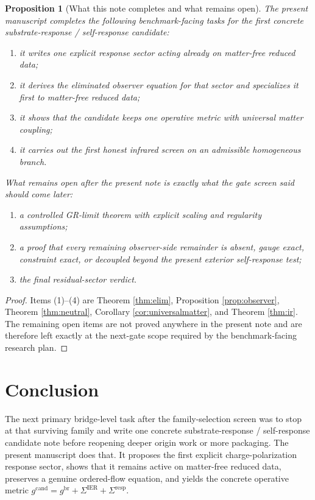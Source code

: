 \documentclass[11pt]{article}
\newcommand{\ObserverMetric}{g^{\mathrm{br}}}
\newcommand{\CandidateMetric}{g^{\mathrm{cand}}}
\newcommand{\BaseShift}{\Sigma^{\mathrm{IER}}}
\newcommand{\ResponseShift}{\Sigma^{\mathrm{resp}}}
\newtheorem{proposition}{Proposition}
\begin{document}
\begin{proposition}[What this note completes and what remains open]
\label{prop:status}
The present manuscript completes the following benchmark-facing tasks for the first concrete substrate-response / self-response candidate:
\begin{enumerate}
    \item it writes one explicit response sector acting already on matter-free reduced data;
    \item it derives the eliminated observer equation for that sector and specializes it first to matter-free reduced data;
    \item it shows that the candidate keeps one operative metric with universal matter coupling;
    \item it carries out the first honest infrared screen on an admissible homogeneous branch.
\end{enumerate}
What remains open after the present note is exactly what the gate screen said should come later:
\begin{enumerate}
    \item a controlled GR-limit theorem with explicit scaling and regularity assumptions;
    \item a proof that every remaining observer-side remainder is absent, gauge exact, constraint exact, or decoupled beyond the present exterior self-response test;
    \item the final residual-sector verdict.
\end{enumerate}
\end{proposition}

\begin{proof}
Items (1)--(4) are Theorem \ref{thm:elim}, Proposition \ref{prop:observer}, Theorem \ref{thm:neutral}, Corollary \ref{cor:universalmatter}, and Theorem \ref{thm:ir}. The remaining open items are not proved anywhere in the present note and are therefore left exactly at the next-gate scope required by the benchmark-facing research plan.
\end{proof}

\section{Conclusion}

The next primary bridge-level task after the family-selection screen was to stop at that surviving family and write one concrete substrate-response / self-response candidate note before reopening deeper origin work or more packaging. The present manuscript does that. It proposes the first explicit charge-polarization response sector, shows that it remains active on matter-free reduced data, preserves a genuine ordered-flow equation, and yields the concrete operative metric \(\CandidateMetric=\ObserverMetric+\BaseShift+\ResponseShift\).
\end{document}
